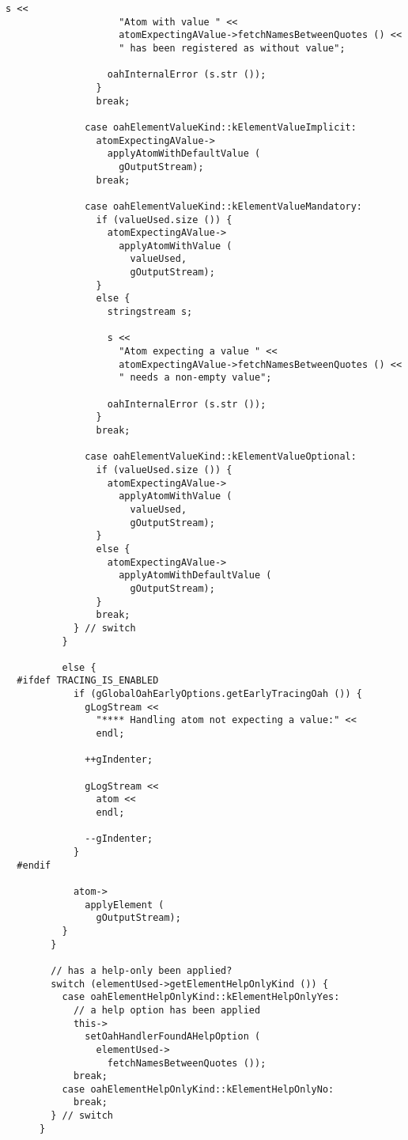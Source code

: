 {\begin{lstlisting}[language=CPlusPlus]
                  s <<
                    "Atom with value " <<
                    atomExpectingAValue->fetchNamesBetweenQuotes () <<
                    " has been registered as without value";

                  oahInternalError (s.str ());
                }
                break;

              case oahElementValueKind::kElementValueImplicit:
                atomExpectingAValue->
                  applyAtomWithDefaultValue (
                    gOutputStream);
                break;

              case oahElementValueKind::kElementValueMandatory:
                if (valueUsed.size ()) {
                  atomExpectingAValue->
                    applyAtomWithValue (
                      valueUsed,
                      gOutputStream);
                }
                else {
                  stringstream s;

                  s <<
                    "Atom expecting a value " <<
                    atomExpectingAValue->fetchNamesBetweenQuotes () <<
                    " needs a non-empty value";

                  oahInternalError (s.str ());
                }
                break;

              case oahElementValueKind::kElementValueOptional:
                if (valueUsed.size ()) {
                  atomExpectingAValue->
                    applyAtomWithValue (
                      valueUsed,
                      gOutputStream);
                }
                else {
                  atomExpectingAValue->
                    applyAtomWithDefaultValue (
                      gOutputStream);
                }
                break;
            } // switch
          }

          else {
  #ifdef TRACING_IS_ENABLED
            if (gGlobalOahEarlyOptions.getEarlyTracingOah ()) {
              gLogStream <<
                "**** Handling atom not expecting a value:" <<
                endl;

              ++gIndenter;

              gLogStream <<
                atom <<
                endl;

              --gIndenter;
            }
  #endif

            atom->
              applyElement (
                gOutputStream);
          }
        }

        // has a help-only been applied?
        switch (elementUsed->getElementHelpOnlyKind ()) {
          case oahElementHelpOnlyKind::kElementHelpOnlyYes:
            // a help option has been applied
            this->
              setOahHandlerFoundAHelpOption (
                elementUsed->
                  fetchNamesBetweenQuotes ());
            break;
          case oahElementHelpOnlyKind::kElementHelpOnlyNo:
            break;
        } // switch
      }


\end{lstlisting}}
